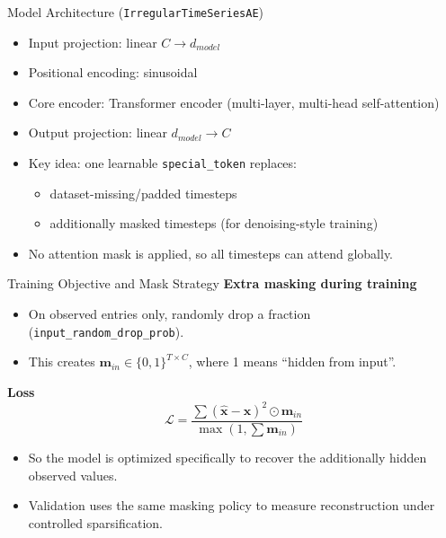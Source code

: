 \documentclass[aspectratio=169]{beamer}
\begin{document}
\begin{frame}{Model Architecture (\texttt{IrregularTimeSeriesAE})}
  \begin{itemize}
    \item Input projection: linear \(C \rightarrow d_{model}\)
    \item Positional encoding: sinusoidal
    \item Core encoder: Transformer encoder (multi-layer, multi-head self-attention)
    \item Output projection: linear \(d_{model} \rightarrow C\)
    \item Key idea: one learnable \texttt{special\_token} replaces:
    \begin{itemize}
      \item dataset-missing/padded timesteps
      \item additionally masked timesteps (for denoising-style training)
    \end{itemize}
    \item No attention mask is applied, so all timesteps can attend globally.
  \end{itemize}
\end{frame}

\begin{frame}{Training Objective and Mask Strategy}
  \textbf{Extra masking during training}
  \begin{itemize}
    \item On observed entries only, randomly drop a fraction (\texttt{input\_random\_drop\_prob}).
    \item This creates \(\mathbf{m}_{in}\in\{0,1\}^{T\times C}\), where 1 means ``hidden from input''.
  \end{itemize}

  \textbf{Loss}
  \[
    \mathcal{L}
    =
    \frac{\sum (\hat{\mathbf{x}}-\mathbf{x})^2 \odot \mathbf{m}_{in}}
         {\max\left(1,\sum \mathbf{m}_{in}\right)}
  \]

  \begin{itemize}
    \item So the model is optimized specifically to recover the additionally hidden observed values.
    \item Validation uses the same masking policy to measure reconstruction under controlled sparsification.
  \end{itemize}
\end{frame}
\end{document}
